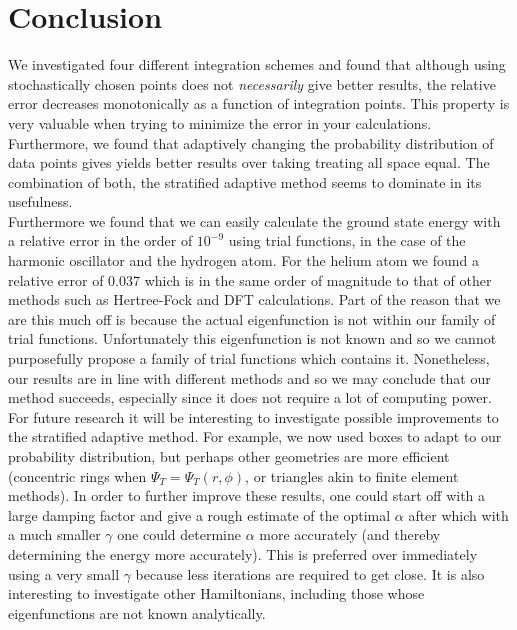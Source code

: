 
\section{Conclusion}
We investigated four different integration schemes and found that although using stochastically chosen points does not \textit{necessarily} give better results, the relative error decreases monotonically as a function of integration points. This property is very valuable when trying to minimize the error in your calculations. Furthermore, we found that adaptively changing the probability distribution of data points gives yields better results over taking treating all space equal. The combination of both, the stratified adaptive method seems to dominate in its usefulness. \\

Furthermore we found that we can easily calculate the ground state energy with a relative error in the order of $10^{-9}$ using trial functions, in the case of the harmonic oscillator and the hydrogen atom. For the helium atom we found a relative error of 0.037 which is in the same order of magnitude to that of other methods such as Hertree-Fock and DFT calculations. Part of the reason that we are this much off is because the actual eigenfunction is not within our family of trial functions. Unfortunately this eigenfunction is not known and so we cannot purposefully propose a family of trial functions which contains it. Nonetheless, our results are in line with different methods and so we may conclude that our method succeeds, especially since it does not require a lot of computing power. \\


For future research it will be interesting to investigate possible improvements to the stratified adaptive method. For example, we now used boxes to adapt to our probability distribution, but perhaps other geometries are more efficient (concentric rings when $\Psi_T = \Psi_T(r, \phi)$, or triangles akin to finite element methods). In order to further improve these results, one could start off with a large damping factor and give a rough estimate of the optimal $\alpha$ after which with a much smaller $\gamma$ one could determine $\alpha$ more accurately (and thereby determining the energy more accurately). This is preferred over immediately using a very small $\gamma$ because less iterations are required to get close. It is also interesting to investigate other Hamiltonians, including those whose eigenfunctions are not known analytically.

